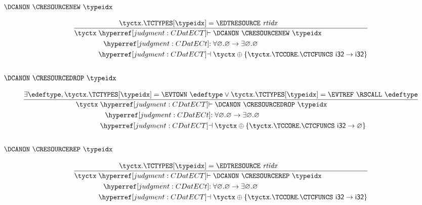 \subsubsection{$\DCANON~\CRESOURCENEW~\typeidx$}
\[
  \frac{
    \tyctx.\TCTYPES[\typeidx] = \EDTRESOURCE~\rtidx\\
  }{
    \begin{aligned}
      \tyctx \vdashh!CDatECT!{}&\DCANON~\CRESOURCENEW~\typeidx\\
      \trelh!CDatECt!{}&\forall\varnothing.\varnothing\to\exists\varnothing.\varnothing\\
      \dashvh!CDatECT!{}&\tyctx\oplus\{\tyctx.\TCCORE.\CTCFUNCS~\i32\to\i32\}\\
    \end{aligned}
  }
\]

\subsubsection{$\DCANON~\CRESOURCEDROP~\typeidx$}
\[
  \frac{
    \exists \edeftype, \tyctx.\TCTYPES[\typeidx] = \EVTOWN~\edeftype \lor \tyctx.\TCTYPES[\typeidx] = \EVTREF~\RSCALL~\edeftype
  }{
    \begin{aligned}
      \tyctx \vdashh!CDatECT!{}&\DCANON~\CRESOURCEDROP~\typeidx\\
      \trelh!CDatECt!{}&\forall\varnothing.\varnothing\to\exists\varnothing.\varnothing\\
      \dashvh!CDatECT!{}&\tyctx\oplus\{\tyctx.\TCCORE.\CTCFUNCS~\i32\to\varnothing\}\\
    \end{aligned}
  }
\]

\subsubsection{$\DCANON~\CRESOURCEREP~\typeidx$}
\[
  \frac{
    \tyctx.\TCTYPES[\typeidx] = \EDTRESOURCE~\rtidx\\
  }{
    \begin{aligned}
      \tyctx \vdashh!CDatECT!{}&\DCANON~\CRESOURCEREP~\typeidx\\
      \trelh!CDatECt!{}&\forall\varnothing.\varnothing\to\exists\varnothing.\varnothing\\
      \dashvh!CDatECT!{}&\tyctx\oplus\{\tyctx.\TCCORE.\CTCFUNCS~\i32\to\i32\}\\
    \end{aligned}
  }
\]

